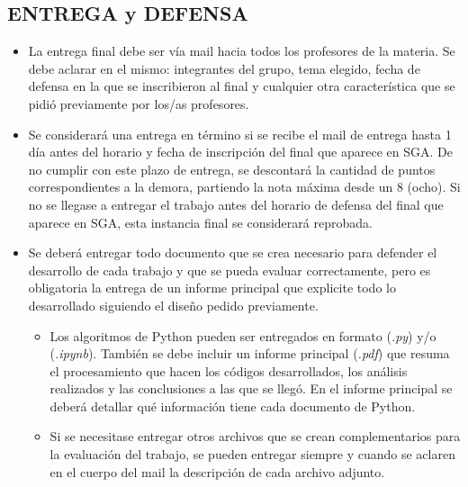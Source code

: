 \documentclass[10pt]{article}
\begin{document}
\vspace{0.25cm}

\subsection*{ENTREGA y DEFENSA}

\begin{itemize}
    \item La entrega final debe ser vía mail hacia todos los profesores de la materia. Se debe aclarar en el mismo: integrantes del grupo, tema elegido, fecha de defensa en la que se inscribieron al final y cualquier otra característica que se pidió previamente por los/as profesores.
    
    \item Se considerará una entrega en término si se recibe el mail de entrega hasta 1 día antes del horario y fecha de inscripción del final que aparece en SGA. De no cumplir con este plazo de entrega, se descontará la cantidad de puntos correspondientes a la demora, partiendo la nota máxima desde un 8 (ocho). Si no se llegase a entregar el trabajo antes del horario de defensa del final que aparece en SGA, esta instancia final se considerará reprobada.
    
    \item Se deberá entregar todo documento que se crea necesario para defender el desarrollo de cada trabajo y que se pueda evaluar correctamente, pero es obligatoria la entrega de un informe principal que explicite todo lo desarrollado siguiendo el diseño pedido previamente.

    \begin{itemize}
        \item[-] Los algoritmos de Python pueden ser entregados en formato (\textit{.py}) y/o (\textit{.ipynb}). También se debe incluir un informe principal (\textit{.pdf}) que resuma el procesamiento que hacen los códigos desarrollados, los análisis realizados y las conclusiones a las que se llegó. En el informe principal se deberá detallar qué información tiene cada documento de Python.

        \item[-] Si se necesitase entregar otros archivos que se crean complementarios para la evaluación del trabajo, se pueden entregar siempre y cuando se aclaren en el cuerpo del mail la descripción de cada archivo adjunto.
        
    \end{itemize}


\end{itemize}
\end{document}
